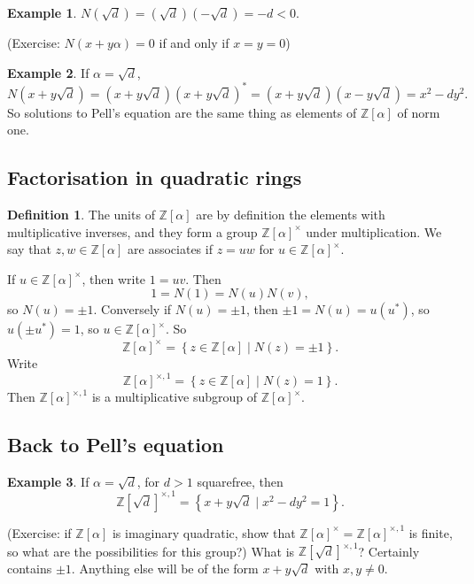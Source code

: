 \documentclass{article}
\newcommand{\Z}{\mathbb{Z}}
\newcommand{\rb}[1]{\left( #1 \right)}
\renewcommand{\sb}[1]{\left[ #1 \right]}
\newcommand{\cb}[1]{\left\{ #1 \right\}}
\theoremstyle{definition}\newtheorem{definition}{Definition}
\theoremstyle{definition}\newtheorem{remark}[definition]{Remark}
\theoremstyle{definition}\newtheorem*{example}{Example}
\theoremstyle{definition}\newtheorem*{note}{Note}
\begin{document}
\begin{example}
$ N\rb{\sqrt{d}} = \rb{\sqrt{d}}\rb{-\sqrt{d}} = -d < 0 $.
\end{example}

(Exercise: $ N\rb{x + y\alpha} = 0 $ if and only if $ x = y = 0 $)

\begin{example}
If $ \alpha = \sqrt{d} $,
$$ N\rb{x + y\sqrt{d}} = \rb{x + y\sqrt{d}}\rb{x + y\sqrt{d}}^* = \rb{x + y\sqrt{d}}\rb{x - y\sqrt{d}} = x^2 - dy^2. $$
So solutions to Pell's equation are the same thing as elements of $ \Z\sb{\alpha} $ of norm one.
\end{example}

\subsection{Factorisation in quadratic rings}

\begin{definition}
The units of $ \Z\sb{\alpha} $ are by definition the elements with multiplicative inverses, and they form a group $ \Z\sb{\alpha}^\times $ under multiplication. We say that $ z, w \in \Z\sb{\alpha} $ are associates if $ z = uw $ for $ u \in \Z\sb{\alpha}^\times $.
\end{definition}

If $ u \in \Z\sb{\alpha}^\times $, then write $ 1 = uv $. Then
$$ 1 = N\rb{1} = N\rb{u}N\rb{v}, $$
so $ N\rb{u} = \pm 1 $. Conversely if $ N\rb{u} = \pm 1 $, then $ \pm 1 = N\rb{u} = u\rb{u^*} $, so $ u\rb{\pm u^*} = 1 $, so $ u \in \Z\sb{\alpha}^\times $. So
$$ \Z\sb{\alpha}^\times = \cb{z \in \Z\sb{\alpha} \mid N\rb{z} = \pm 1}. $$
Write
$$ \Z\sb{\alpha}^{\times, 1} = \cb{z \in \Z\sb{\alpha} \mid N\rb{z} = 1}. $$
Then $ \Z\sb{\alpha}^{\times, 1} $ is a multiplicative subgroup of $ \Z\sb{\alpha}^\times $.

\subsection{Back to Pell's equation}

\begin{example}
If $ \alpha = \sqrt{d} $, for $ d > 1 $ squarefree, then
$$ \Z\sb{\sqrt{d}}^{\times, 1} = \cb{x + y\sqrt{d} \mid x^2 - dy^2 = 1}. $$
\end{example}

(Exercise: if $ \Z\sb{\alpha} $ is imaginary quadratic, show that $ \Z\sb{\alpha}^\times = \Z\sb{\alpha}^{\times, 1} $ is finite, so what are the possibilities for this group?) What is $ \Z\sb{\sqrt{d}}^{\times, 1} $? Certainly contains $ \pm 1 $. Anything else will be of the form $ x + y\sqrt{d} $ with $ x, y \ne 0 $.
\end{document}
